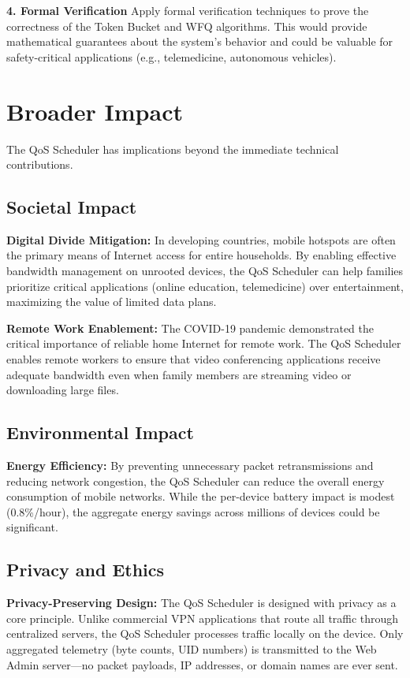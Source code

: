 \textbf{4. Formal Verification}
Apply formal verification techniques to prove the correctness of the Token Bucket and WFQ algorithms. This would provide mathematical guarantees about the system's behavior and could be valuable for safety-critical applications (e.g., telemedicine, autonomous vehicles).

\section{Broader Impact}
\label{sec:broader_impact}

The QoS Scheduler has implications beyond the immediate technical contributions.

\subsection{Societal Impact}

\textbf{Digital Divide Mitigation:}
In developing countries, mobile hotspots are often the primary means of Internet access for entire households. By enabling effective bandwidth management on unrooted devices, the QoS Scheduler can help families prioritize critical applications (online education, telemedicine) over entertainment, maximizing the value of limited data plans.

\textbf{Remote Work Enablement:}
The COVID-19 pandemic demonstrated the critical importance of reliable home Internet for remote work. The QoS Scheduler enables remote workers to ensure that video conferencing applications receive adequate bandwidth even when family members are streaming video or downloading large files.

\subsection{Environmental Impact}

\textbf{Energy Efficiency:}
By preventing unnecessary packet retransmissions and reducing network congestion, the QoS Scheduler can reduce the overall energy consumption of mobile networks. While the per-device battery impact is modest (0.8\%/hour), the aggregate energy savings across millions of devices could be significant.

\subsection{Privacy and Ethics}

\textbf{Privacy-Preserving Design:}
The QoS Scheduler is designed with privacy as a core principle. Unlike commercial VPN applications that route all traffic through centralized servers, the QoS Scheduler processes traffic locally on the device. Only aggregated telemetry (byte counts, UID numbers) is transmitted to the Web Admin server---no packet payloads, IP addresses, or domain names are ever sent.

